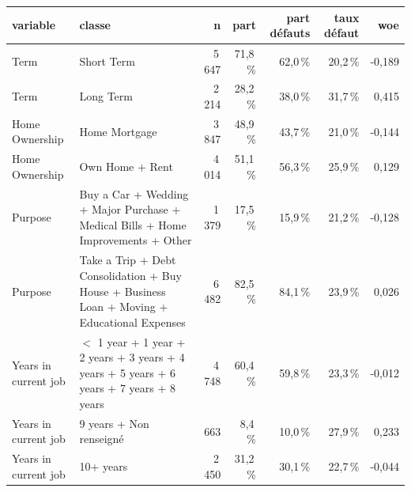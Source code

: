 \begin{tabular}{lp{6.5cm}rrrrr}
\toprule
\textbf{variable} & \textbf{classe} & \textbf{n} & \textbf{part} & \textbf{part défauts} & \textbf{taux défaut} & \textbf{woe} \\
\midrule
Term & Short Term & 5\,647 & 71,8\,\% & 62,0\,\% & 20,2\,\% & -0,189 \\
Term & Long Term & 2\,214 & 28,2\,\% & 38,0\,\% & 31,7\,\% & 0,415 \\
Home Ownership & Home Mortgage & 3\,847 & 48,9\,\% & 43,7\,\% & 21,0\,\% & -0,144 \\
Home Ownership & Own Home + Rent & 4\,014 & 51,1\,\% & 56,3\,\% & 25,9\,\% & 0,129 \\
Purpose & Buy a Car + Wedding + Major Purchase + Medical Bills + Home Improvements + Other & 1\,379 & 17,5\,\% & 15,9\,\% & 21,2\,\% & -0,128 \\
Purpose & Take a Trip + Debt Consolidation + Buy House + Business Loan + Moving + Educational Expenses & 6\,482 & 82,5\,\% & 84,1\,\% & 23,9\,\% & 0,026 \\
Years in current job & $<$ 1 year + 1 year + 2 years + 3 years + 4 years + 5 years + 6 years + 7 years + 8 years & 4\,748 & 60,4\,\% & 59,8\,\% & 23,3\,\% & -0,012 \\
Years in current job & 9 years + Non renseigné & 663 & 8,4\,\% & 10,0\,\% & 27,9\,\% & 0,233 \\
Years in current job & 10+ years & 2\,450 & 31,2\,\% & 30,1\,\% & 22,7\,\% & -0,044 \\
\bottomrule
\end{tabular}
